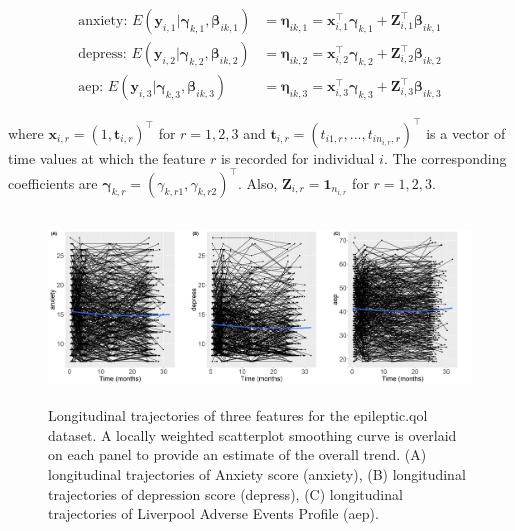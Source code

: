 \begin{align*}

  \text{anxiety: }  E(\boldsymbol{y}_{i,1}|\boldsymbol{\gamma}_{k,1}, \boldsymbol{\beta}_{ik,1}) & = \boldsymbol{\eta}_{ik,1}  =   \boldsymbol{x}_{i,1}^\top\boldsymbol{\gamma}_{k,1} +  \boldsymbol{Z}_{i,1}^\top\boldsymbol{\beta}_{ik,1}  \\

  \text{depress: }    E(\boldsymbol{y}_{i,2}|\boldsymbol{\gamma}_{k,2}, \boldsymbol{\beta}_{ik,2}) & = \boldsymbol{\eta}_{ik,2}  =  \boldsymbol{x}_{i,2}^\top\boldsymbol{\gamma}_{k,2} +  \boldsymbol{Z}_{i,2}^\top\boldsymbol{\beta}_{ik,2} \\

  \text{aep: }   E(\boldsymbol{y}_{i,3}|\boldsymbol{\gamma}_{k,3},\boldsymbol{\beta}_{ik,3}) & =  \boldsymbol{\eta}_{ik,3} = \boldsymbol{x}_{i,3}^\top\boldsymbol{\gamma}_{k,3} +  \boldsymbol{Z}_{i,3}^\top\boldsymbol{\beta}_{ik,3}

\end{align*}

where $ \boldsymbol{x}_{i,r} = (1,  \boldsymbol{t}_{i,r})^\top$ for $r=1,2,3$ and $\boldsymbol{t}_{i,r} = (t_{i1,r},...,t_{in_{i,r},r})^\top$ is a vector of time values at which the feature $r$ is recorded for individual $i$. The corresponding coefficients are $\boldsymbol{\gamma}_{k,r} =  (\gamma_{k,r1}, \gamma_{k,r2})^\top$. Also, $\boldsymbol{Z}_{i,r} =\boldsymbol{1}_{n_{i,r}}$ for $r=1,2,3$.

\begin{figure}[h]
\centering
\includegraphics[width=\textwidth,height=5cm]{./Figures/traj.JPEG}
\caption{\label{fig:traj_demo} Longitudinal trajectories of three features for the epileptic.qol dataset. A locally weighted scatterplot smoothing curve is overlaid on each panel to provide an estimate of the overall trend. (A) longitudinal trajectories of Anxiety score (anxiety), (B) longitudinal trajectories of depression score (depress), (C) longitudinal trajectories of Liverpool Adverse Events Profile (aep).}
\end{figure}

